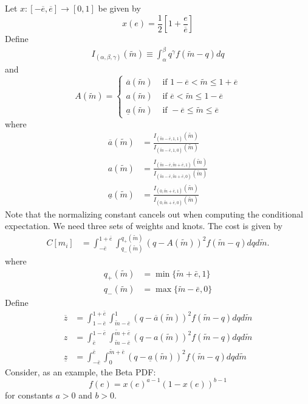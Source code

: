 \documentclass{article}
\begin{document}
\noindent Let $x:[-\overline{e},\overline{e}]\rightarrow[0,1]$ be given by
\begin{equation}
	x(e)=\frac{1}{2}\left[1+\frac{e}{\overline{e}}\right]
\end{equation}
Define
\begin{align}
	I_{(\alpha,\beta,\gamma)}(\widetilde{m})\equiv\int_{\alpha}^{\beta}{q^{\gamma}f(\tilde{m}-q)dq}
\end{align}
and
\begin{equation}
	A(\widetilde{m})=
	\begin{cases}
		\overline{a}(\widetilde{m}) & \text{ if } 1-\overline{e}<\widetilde{m}\leq 1+\overline{e}\\
		a(\widetilde{m}) & \text{ if } \overline{e}<\widetilde{m}\leq 1-\overline{e}\\
		\underline{a}(\widetilde{m}) & \text{ if } -\overline{e}\leq\widetilde{m}\leq \overline{e}
	\end{cases}
\end{equation}
where
\begin{align}
	\overline{a}(\widetilde{m})&=\frac{I_{(\widetilde{m}-\bar{e},1,1)}(\widetilde{m})}{I_{(\widetilde{m}-\bar{e},1,0)}(\widetilde{m})}\\
	a(\widetilde{m})&=\frac{I_{(\widetilde{m}-\bar{e},\widetilde{m}+\bar{e},1)}(\widetilde{m})}{I_{(\widetilde{m}-\bar{e},\widetilde{m}+\bar{e},0)}(\widetilde{m})}\\
	\underline{a}(\widetilde{m})&=\frac{I_{(0,\widetilde{m}+\bar{e},1)}(\widetilde{m})}{I_{(0,\widetilde{m}+\bar{e},0)}(\widetilde{m})}
\end{align}
Note that the normalizing constant cancels out when computing the conditional expectation. We need three sets of weights and knots. The cost is given by
\begin{align}
	C[m_{i}]&=\int_{-\bar{e}}^{1+\bar{e}}{\int_{q_{-}(\widetilde{m})}^{q_{+}(\widetilde{m})}{(q-A(\widetilde{m}))^{2}f(\widetilde{m}-q)dq}d\widetilde{m}}.
\end{align}
where
\begin{align}
	q_{+}(\widetilde{m})&=\min\{\widetilde{m}+\bar{e},1\}\\
	q_{-}(\widetilde{m})&=\max\{\widetilde{m}-\bar{e},0\}
\end{align}
Define
\begin{align}
	\overline{z}&=\int_{1-\bar{e}}^{1+\bar{e}}{\int_{\widetilde{m}-\bar{e}}^{1}{(q-\overline{a}(\widetilde{m}))^{2}f(\widetilde{m}-q)dq}d\widetilde{m}}\\
	z&=\int_{\bar{e}}^{1-\bar{e}}{\int_{\widetilde{m}-\bar{e}}^{\widetilde{m}+\bar{e}}{(q-a(\widetilde{m}))^{2}f(\widetilde{m}-q)dq}d\widetilde{m}}\\
	\underline{z}&=\int_{-\bar{e}}^{\bar{e}}{\int_{0}^{\widetilde{m}+\bar{e}}{(q-\underline{a}(\widetilde{m}))^{2}f(\widetilde{m}-q)dq}d\widetilde{m}}
\end{align}
Consider, as an example, the Beta PDF:
\begin{equation}
	f(e)=x(e)^{a-1}(1-x(e))^{b-1}
\end{equation}
for constants $a>0$ and $b>0$. 
\end{document}
